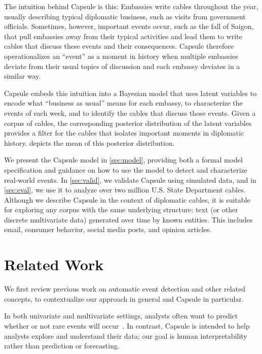 The intuition behind Capsule is this: Embassies write cables
throughout the year, usually describing typical diplomatic business,
such as visits from government officials. Sometimes, however,
important events occur, such as the fall of Saigon, that pull
embassies away from their typical activities and lead them to write
cables that discuss these events and their consequences. Capsule
therefore operationalizes an ``event'' as a moment in history when
multiple embassies deviate from their usual topics of discussion and
each embassy deviates in a similar way.

Capsule embeds this intuition into a Bayesian model that uses latent
variables to encode what ``business as usual'' means for each embassy,
to characterize the events of each week, and to identify the cables
that discuss those events. Given a corpus of cables, the corresponding
posterior distribution of the latent variables provides a filter for
the cables that isolates important moments in diplomatic
history.  depicts the mean of this posterior
distribution.

We present the Capsule model in \cref{sec:model}, providing both a
formal model specification and guidance on how to use the model to
detect and characterize real-world events. In \cref{sec:valid}, we
validate Capsule using simulated data, and in \cref{sec:eval},
we use it to analyze over two million U.S. State Department
cables. Although we describe Capsule in the context of diplomatic
cables, it is suitable for exploring any corpus with the same
underlying structure: text (or other discrete multivariate data)
generated over time by known entities. This includes email, consumer
behavior, social media posts, and opinion articles.

\section{Related Work}
\label{sec:relatedwork}

We first review previous work on automatic event detection and other
related concepts, to contextualize our approach in general and Capsule
in particular.

In both univariate and multivariate settings, analysts often want to
predict whether or not rare events will
occur~\cite{weiss1998learning,das2008anomaly}. In contrast, Capsule is
intended to help analysts explore and understand their data; our goal
is human interpretability rather than prediction or forecasting.

